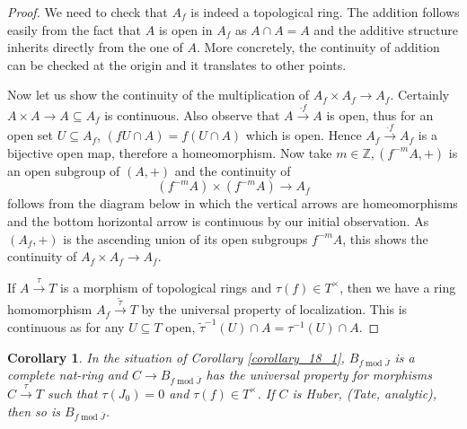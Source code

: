 \documentclass[8pt]{article}
\numberwithin{equation}{section}
\newtheorem{corollary}{Corollary} [subsection]
\DeclareMathOperator{\tmod}{mod}
\newcommand{\Z}[0]{\mathbb{Z}}
\begin{document}
\begin{proof}
We need to check that $A_f$ is indeed a topological ring. The addition follows easily from the fact that $A$ is open in $A_f$ as $A\cap A = A$ and the additive structure inherits directly from the one of $A$.
More concretely, the continuity of addition can be checked at the origin and it translates to other points. 
\par Now let us show the continuity of the multiplication of $A_f\times A_f\to A_f$. Certainly $A\times A\to A\subseteq A_f$ is continuous.
Also observe that $A\stackrel{\cdot f}{\to}A$ is open, thus for an open set $U\subseteq A_f$, $(fU\cap A) = f(U\cap A)$ which is open. Hence $A_f\stackrel{\cdot f}{\to}A_f$ is a bijective open map, therefore a homeomorphism.
Now take $m\in\Z,(f^{-m}A,+)$ is an open subgroup of $(A,+)$ and the continuity of 
\begin{equation*}
    (f^{-m}A)\times(f^{-m}A)\to A_f
\end{equation*}
follows from the diagram below in which the vertical arrows are homeomorphisms and the bottom horizontal arrow is continuous by our initial observation. As $(A_f,+)$ is the ascending union of its open subgroups $f^{-m}A$, this shows the continuity of $A_f\times A_f\to A_f$.
\begin{center}
\end{center}
If $A\stackrel{\tau}{\to}T$ is a morphism of topological rings and $\tau(f)\in T^\times$, then we have a ring homomorphism $A_f\stackrel{\tilde{\tau}}{\to}T$ by the universal property of localization. This is continuous as for any $U\subseteq T$ open,  $\tilde{\tau}^{-1}(U)\cap A = \tau^{-1}(U)\cap A$. 
\end{proof}
\begin{corollary}
    \label{corollary_19_2}
    In the situation of Corollary \ref{corollary_18_1}, $B_{f\tmod\overline{J}}$ is a complete nat-ring and $C\to B_{f\tmod{\overline{J}}}$ has the universal property for morphisms $C\stackrel{\tau}{\to}T$ such that $\tau(J_0)=0$ and $\tau(f)\in T^\times$. If $C$ is Huber, (Tate, analytic), then so is $B_{f\tmod{\overline{J}}}$.
\end{corollary}
\end{document}
